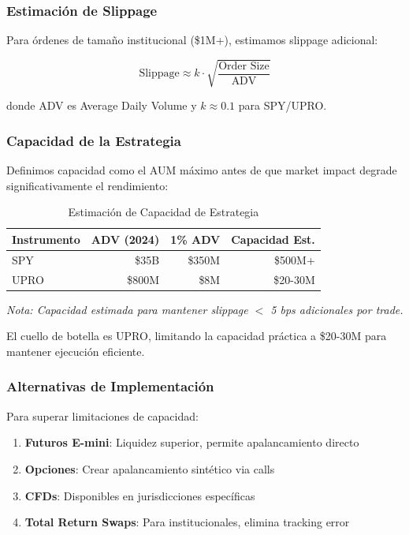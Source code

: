 \subsubsection{Estimaci\'on de Slippage}

Para \'ordenes de tama\~no institucional (\$1M+), estimamos slippage adicional:

\begin{equation}
\text{Slippage} \approx k \cdot \sqrt{\frac{\text{Order Size}}{\text{ADV}}}
\end{equation}

donde ADV es Average Daily Volume y $k \approx 0.1$ para SPY/UPRO.

\subsubsection{Capacidad de la Estrategia}

Definimos capacidad como el AUM m\'aximo antes de que market impact degrade significativamente el rendimiento:

\begin{table}[htbp]
\centering
\caption{Estimaci\'on de Capacidad de Estrategia}
\label{tab:capacity}
\begin{tabular}{@{}lrrr@{}}
\toprule
\textbf{Instrumento} & \textbf{ADV (2024)} & \textbf{1\% ADV} & \textbf{Capacidad Est.} \\
\midrule
SPY & \$35B & \$350M & \$500M+ \\
UPRO & \$800M & \$8M & \$20-30M \\
\bottomrule
\end{tabular}
\vspace{0.2cm}
\small\textit{
\small
Nota: Capacidad estimada para mantener slippage $<$ 5 bps adicionales por trade.}
\end{table}

El cuello de botella es UPRO, limitando la capacidad pr\'actica a \$20-30M para mantener ejecuci\'on eficiente.

\subsubsection{Alternativas de Implementaci\'on}

Para superar limitaciones de capacidad:

\begin{enumerate}
    \item \textbf{Futuros E-mini}: Liquidez superior, permite apalancamiento directo
    \item \textbf{Opciones}: Crear apalancamiento sint\'etico via calls
    \item \textbf{CFDs}: Disponibles en jurisdicciones espec\'ificas
    \item \textbf{Total Return Swaps}: Para institucionales, elimina tracking error
\end{enumerate}

